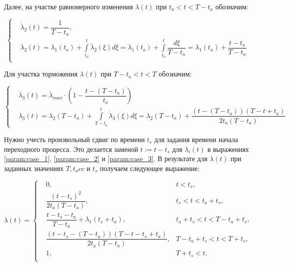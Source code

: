 Далее, на участке равномерного изменения $\lambda(t)$ при $t_a < t < T-t_a$ обозначим:


\begin{equation}
\label{param:case_2}
\left\{
\begin{alignedat}{1}
  &\dot{\lambda}_2(t) = \dfrac{1}{T-t_a}, \\
  &\lambda_2(t) = \lambda_1(t_a) + \int \limits_{t_a}^{t}\dot{\lambda}_2(\xi)d\xi = \lambda_1(t_a) + \int\limits_{t_a}^t\dfrac{d\xi}{T-t_a} = \lambda_1(t_a) + \dfrac{t - t_a}{T-t_a}\\  
\end{alignedat}
\right.
\end{equation}


Для участка торможения  $\lambda(t)$ при $T-t_a < t < T$ обозначим:

\begin{equation}
\label{param:case_3}
\left\{
\begin{alignedat}{1}
  &\dot{\lambda}_3(t) = \dot{\lambda}_{max} \cdot \left(1 - \dfrac{t - (T-t_a)}{t_a}\right)\\
  &\lambda_3(t) = \lambda_2(T-t_a) + \int\limits_{T-t_a}^t \dot{\lambda}_3(\xi)d\xi = \lambda_2(T-t_a) + \dfrac{(t - (T - t_a))(T - t + t_a)}{2t_a(T - t_a)}
\end{alignedat}
\right.
\end{equation}


Нужно учесть произвольный сдвиг по времени $t_s$ для задания времени начала переходного процесса. Это делается заменой $t := t - t_s$ для $\lambda_i(t)$ в выражениях \ref{param:case_1}, \ref{param:case_2} и \ref{param:case_3}. В результате для $\lambda(t)$ при заданных значениях $T, t_acc$ и $t_s$ получаем следующее выражение:

\begin{equation}
\label{param:solution}
\lambda(t) = 
\left\{
\begin{alignedat}{2}
& 0, &t < t_s,\\
&\dfrac{(t-t_s)^2}{2t_a(T-t_a)}, &t_s < t < t_a + t_s,\\
&\dfrac{t - t_s - t_a}{T - t_a} + \lambda_1(t_s + t_a), & t_a + t_s < t < T - t_a + t_s,\\
&\dfrac{(t - t_s - (T - t_a))(T - t - t_s + t_a)}{2t_a(T - t_a)}, & T-t_a + t_s < t < T + t_s,\\
&1, & T+ t_s < t.\\
\end{alignedat}
\right.
\end{equation}

